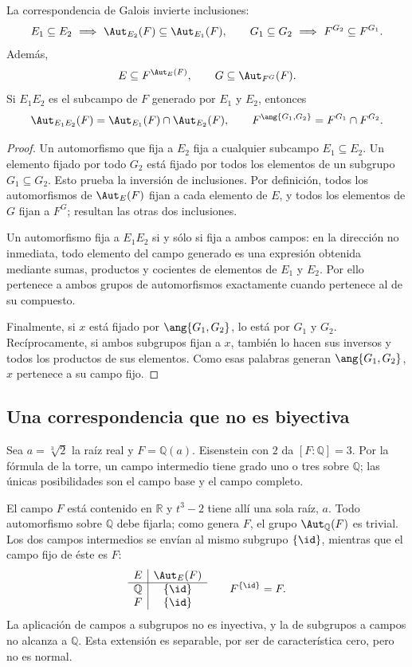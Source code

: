 \begin{lema}\label{lema:C26-correspondencia}
La correspondencia de Galois invierte inclusiones:
\[
E_1\subseteq E_2\ \Longrightarrow\ \Aut_{E_2}(F)\subseteq\Aut_{E_1}(F),
\qquad
G_1\subseteq G_2\ \Longrightarrow\ F^{G_2}\subseteq F^{G_1}.
\]
Además,
\[
E\subseteq F^{\Aut_E(F)},\qquad G\subseteq\Aut_{F^G}(F).
\]
Si $E_1E_2$ es el subcampo de $F$ generado por $E_1$ y $E_2$, entonces
\[
\Aut_{E_1E_2}(F)=\Aut_{E_1}(F)\cap\Aut_{E_2}(F),
\qquad
F^{\ang{G_1,G_2}}=F^{G_1}\cap F^{G_2}.
\]
\end{lema}
\begin{proof}
Un automorfismo que fija a $E_2$ fija a cualquier subcampo $E_1\subseteq E_2$. Un elemento fijado por todo $G_2$ está fijado por todos los elementos de un subgrupo $G_1\subseteq G_2$. Esto prueba la inversión de inclusiones. Por definición, todos los automorfismos de $\Aut_E(F)$ fijan a cada elemento de $E$, y todos los elementos de $G$ fijan a $F^G$; resultan las otras dos inclusiones.

Un automorfismo fija a $E_1E_2$ si y sólo si fija a ambos campos: en la dirección no inmediata, todo elemento del campo generado es una expresión obtenida mediante sumas, productos y cocientes de elementos de $E_1$ y $E_2$. Por ello pertenece a ambos grupos de automorfismos exactamente cuando pertenece al de su compuesto.

Finalmente, si $x$ está fijado por $\ang{G_1,G_2}$, lo está por $G_1$ y $G_2$. Recíprocamente, si ambos subgrupos fijan a $x$, también lo hacen sus inversos y todos los productos de sus elementos. Como esas palabras generan $\ang{G_1,G_2}$, $x$ pertenece a su campo fijo.
\end{proof}

\subsection{Una correspondencia que no es biyectiva}
\begin{ejem}\label{ejem:C26-cubica-real}
Sea $a=\sqrt[3]{2}$ la raíz real y $F=\mathbb Q(a)$. Eisenstein con $2$ da $[F:\mathbb Q]=3$. Por la fórmula de la torre, un campo intermedio tiene grado uno o tres sobre $\mathbb Q$; las únicas posibilidades son el campo base y el campo completo.

El campo $F$ está contenido en $\mathbb R$ y $t^3-2$ tiene allí una sola raíz, $a$. Todo automorfismo sobre $\mathbb Q$ debe fijarla; como genera $F$, el grupo $\Aut_{\mathbb Q}(F)$ es trivial. Los dos campos intermedios se envían al mismo subgrupo $\{\id\}$, mientras que el campo fijo de éste es $F$:
\[
\begin{array}{c|c}
E&\Aut_E(F)\\\hline
\mathbb Q&\{\id\}\\
F&\{\id\}
\end{array}
\qquad F^{\{\id\}}=F.
\]
La aplicación de campos a subgrupos no es inyectiva, y la de subgrupos a campos no alcanza a $\mathbb Q$. Esta extensión es separable, por ser de característica cero, pero no es normal.
\end{ejem}


